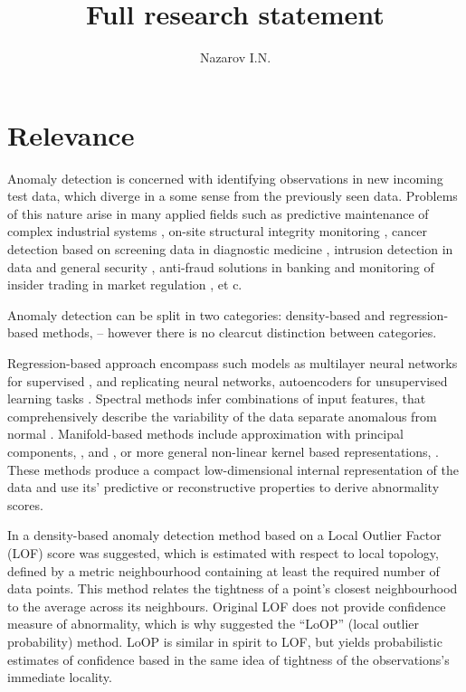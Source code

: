 \documentclass{extarticle}
\title{Full research statement}
\author{Nazarov I.N.}
\begin{document}
\maketitle

\section{Relevance} %
\label{sec:relevance}

Anomaly detection is concerned with identifying observations in new incoming test
data, which diverge in a some sense from the previously seen data. Problems of this
nature arise in many applied fields such as predictive maintenance of complex industrial
systems \cite{tarassenko2009}, on-site structural integrity monitoring \cite{surace2010},
cancer detection based on screening data in diagnostic medicine \cite{tarassenko1995,quinn2007,clifton2011},
intrusion detection in data and general security \cite{jyothsna2011}, anti-fraud
solutions in banking and monitoring of insider trading in market regulation \cite{patcha2007},
et c.

Anomaly detection can be split in two categories: density-based and regression-based
methods, -- however there is no clearcut distinction between categories.

Regression-based approach encompass such models as multilayer neural networks for
supervised \cite{augusteijn2002}, and replicating neural networks, autoencoders
for unsupervised learning tasks \cite{hawkins2002,williams2002}. Spectral methods
infer combinations of input features, that comprehensively describe the variability
of the data separate anomalous from normal \cite{chandola2009}. Manifold-based
methods include approximation with principal components, \cite{dutta2007,shyu2003},
and \cite{jolliffe2014}, or more general non-linear kernel based representations,
\cite{hoffmann2007,scholkopf1998}. These methods produce a compact low-dimensional
internal representation of the data and use its' predictive or reconstructive properties
to derive abnormality scores.

In \cite{breunig2000} a density-based anomaly detection method based on a Local Outlier
Factor (LOF) score was suggested, which is estimated with respect to local topology,
defined by a metric neighbourhood containing at least the required number of data
points. This method relates the tightness of a point's closest neighbourhood to the
average across its neighbours. Original LOF does not provide confidence measure of
abnormality, which is why \cite{kriegel2009} suggested the ``LoOP'' (local outlier
probability) method. LoOP is similar in spirit to LOF, but yields probabilistic
estimates of confidence based in the same idea of tightness of the observations's
immediate locality.
\end{document}
